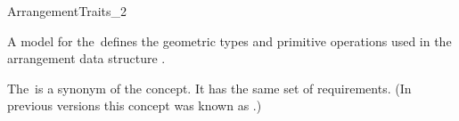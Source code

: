 
\ccRefPageBegin

\begin{ccRefConcept}{ArrangementTraits_2}

\ccDefinition
   A model for the\ccRefName\ defines the geometric types and
   primitive operations used in the arrangement data structure
   .

  The\ccRefName\ is a synonym of the
   concept. It has the same
  set of requirements. (In previous versions this concept was known as
  .)

\ccHasModels
  \\
  \\
  \\

\end{ccRefConcept}

\ccRefPageEnd
